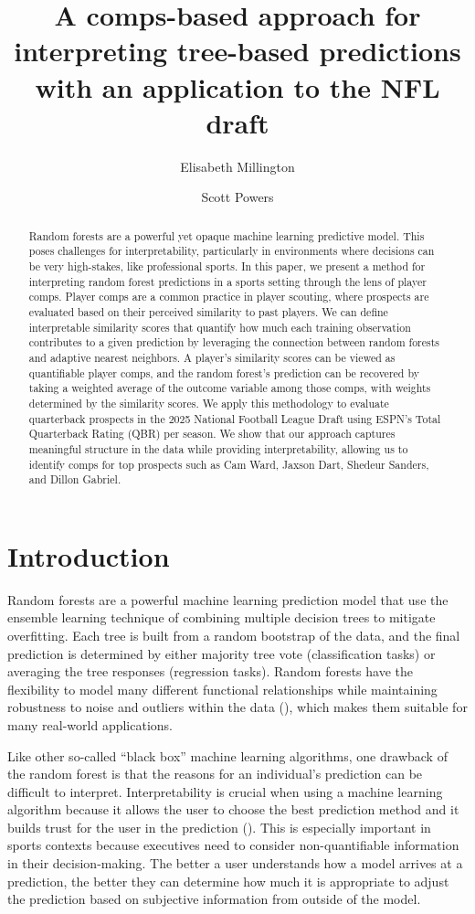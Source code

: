 \documentclass{article}
\title{A comps-based approach for interpreting tree-based predictions with an application to the NFL draft}
\author[1]{Elisabeth Millington}
\author[2]{Scott Powers}
\affil[1]{Department of Kinesiology, Rice University}
\affil[2]{Department of Sport Management, Rice University}
\begin{document}
\maketitle

\begin{abstract}
  Random forests are a powerful yet opaque machine learning predictive model. This poses challenges for interpretability, particularly in environments where decisions can be very high-stakes, like professional sports. In this paper, we present a method for interpreting random forest predictions in a sports setting through the lens of player comps. Player comps are a common practice in player scouting, where prospects are evaluated based on their perceived similarity to past players. We can define interpretable similarity scores that quantify how much each training observation contributes to a given prediction by leveraging the connection between random forests and adaptive nearest neighbors. A player's similarity scores can be viewed as quantifiable player comps, and the random forest's prediction can be recovered by taking a weighted average of the outcome variable among those comps, with weights determined by the similarity scores. We apply this methodology to evaluate quarterback prospects in the 2025 National Football League Draft using ESPN's Total Quarterback Rating (QBR) per season. We show that our approach captures meaningful structure in the data while providing interpretability, allowing us to identify comps for top prospects such as Cam Ward, Jaxson Dart, Shedeur Sanders, and Dillon Gabriel.
\end{abstract}

\section{Introduction}

Random forests are a powerful machine learning prediction model that use the ensemble learning technique of combining multiple decision trees to mitigate overfitting. Each tree is built from a random bootstrap of the data, and the final prediction is determined by either majority tree vote (classification tasks) or averaging the tree responses (regression tasks). Random forests have the flexibility to model many different functional relationships while maintaining robustness to noise and outliers within the data (\cite{breiman_random_2001}), which makes them suitable for many real-world applications.

Like other so-called ``black box'' machine learning algorithms, one drawback of the random forest is that the reasons for an individual's prediction can be difficult to interpret. Interpretability is crucial when using a machine learning algorithm because it allows the user to choose the best prediction method and it builds trust for the user in the prediction (\cite{ribeiro_why_2016}). This is especially important in sports contexts because executives need to consider non-quantifiable information in their decision-making. The better a user understands how a model arrives at a prediction, the better they can determine how much it is appropriate to adjust the prediction based on subjective information from outside of the model.
\end{document}
